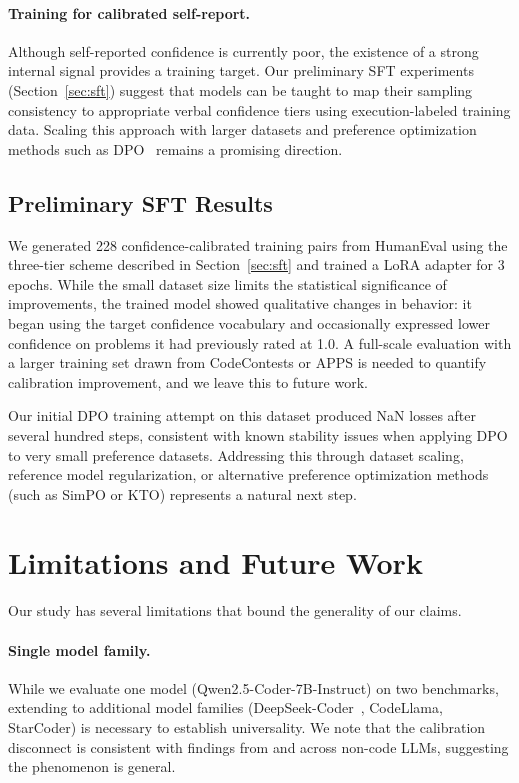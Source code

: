\documentclass{article}
\begin{document}
\paragraph{Training for calibrated self-report.}
Although self-reported confidence is currently poor, the existence of a strong internal signal provides a training target. Our preliminary SFT experiments (Section~\ref{sec:sft}) suggest that models can be taught to map their sampling consistency to appropriate verbal confidence tiers using execution-labeled training data. Scaling this approach with larger datasets and preference optimization methods such as DPO~\citep{rafailov2023direct} remains a promising direction.

\subsection{Preliminary SFT Results}

We generated 228 confidence-calibrated training pairs from HumanEval using the three-tier scheme described in Section~\ref{sec:sft} and trained a LoRA adapter for 3 epochs. While the small dataset size limits the statistical significance of improvements, the trained model showed qualitative changes in behavior: it began using the target confidence vocabulary and occasionally expressed lower confidence on problems it had previously rated at 1.0. A full-scale evaluation with a larger training set drawn from CodeContests or APPS is needed to quantify calibration improvement, and we leave this to future work.

Our initial DPO training attempt on this dataset produced NaN losses after several hundred steps, consistent with known stability issues when applying DPO to very small preference datasets. Addressing this through dataset scaling, reference model regularization, or alternative preference optimization methods (such as SimPO or KTO) represents a natural next step.

\section{Limitations and Future Work}
\label{sec:limitations}

Our study has several limitations that bound the generality of our claims.

\paragraph{Single model family.}
While we evaluate one model (Qwen2.5-Coder-7B-Instruct) on two benchmarks, extending to additional model families (DeepSeek-Coder~\citep{guo2024deepseek}, CodeLlama, StarCoder) is necessary to establish universality. We note that the calibration disconnect is consistent with findings from \citet{xiong2024can} and \citet{tian2023just} across non-code LLMs, suggesting the phenomenon is general.
\end{document}
